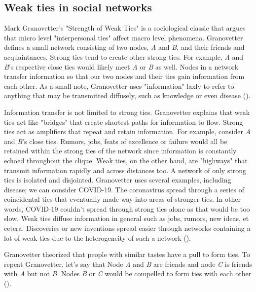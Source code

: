 \documentclass[12pt, a4paper]{article}
\begin{document}
\subsection{Weak ties in social networks}
Mark Granovetter's "Strength of Weak Ties" is a sociological classic that argues that micro level "interpersonal ties" affect macro level phenomena. Granovetter defines a small network consisting of two nodes, \textit{A} and \textit{B}, and their friends and acquaintances. Strong ties tend to create other strong ties. For example, \textit{A} and \textit{B}'s respective close ties would likely meet \textit{A} or \textit{B} as well. Nodes in a network transfer information so that our two nodes and their ties gain information from each other. As a small note, Granovetter uses "information" laxly to refer to anything that may be transmitted diffusely, such as knowledge or even disease (\cite{granovetter1973}).

Information transfer is not limited to strong ties. Granovetter explains that weak ties act like "bridges" that create shortest paths for information to flow. Strong ties act as amplifiers that repeat and retain information. For example, consider \textit{A} and \textit{B}'s close ties. Rumors, jobs, feats of excellence or failure would all be retained within the strong ties of the network since information is constantly echoed throughout the clique. Weak ties, on the other hand, are "highways" that transmit information rapidly and across distances too. A network of only strong ties is isolated and disjointed. Granovetter uses several examples, including disease; we can consider COVID-19. The coronavirus spread through a series of coincidental ties that eventually made way into areas of stronger ties. In other words, COVID-19 couldn't spread through strong ties alone as that would be too slow. Weak ties diffuse information in general such as jobs, rumors, new ideas, et cetera. Discoveries or new inventions spread easier through networks containing a lot of weak ties due to the heterogeneity of such a network (\cite{granovetter1973}).

Granovetter theorized that people with similar tastes have a pull to form ties. To repeat Granovetter, let's say that Node \textit{A} and \textit{B} are friends and node \textit{C} is friends with \textit{A} but not \textit{B}. Nodes \textit{B} or \textit{C} would be compelled to form ties with each other (\cite{granovetter1973}).
\end{document}
